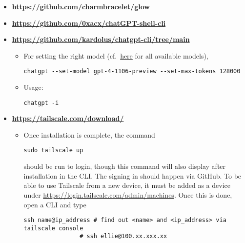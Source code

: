 \documentclass[12pt, a4paper]{article}
\numberwithin{equation}{section}
\theoremstyle{definition}
\theoremstyle{definition}
\begin{document}
	\begin{itemize}
		\item \textbf{\url{https://github.com/charmbracelet/glow}}
		
		\item \textbf{\url{https://github.com/0xacx/chatGPT-shell-cli}}
		
		\item \textbf{\url{https://github.com/kardolus/chatgpt-cli/tree/main}}	
		
		\begin{itemize}
			\item For setting the right model (cf.~\href{https://platform.openai.com/docs/models/gpt-4-and-gpt-4-turbo}{here} for all available models), 
			
			\begin{lstlisting}[style=mystylebash, label=alg:chatgpt_set_model, xleftmargin=\parindent]
				chatgpt --set-model gpt-4-1106-preview --set-max-tokens 128000
			\end{lstlisting}

			\item Usage:

			\begin{lstlisting}[style=mystylebash, label=alg:chatgpt_usage, xleftmargin=\parindent]
				chatgpt -i
			\end{lstlisting}
		\end{itemize}

		\item \textbf{\url{https://tailscale.com/download/}}
		
		\begin{itemize}
			\item Once installation is complete, the command 
			
			\begin{lstlisting}[style=mystylepython, label=alg:tailscale_login, xleftmargin=\parindent]
				sudo tailscale up
			\end{lstlisting}
		
			should be run to login, though this command will also display after installation in the CLI. The signing in should happen via GitHub. To be able to use Tailscale from a new device, it must be added as a device under \url{https://login.tailscale.com/admin/machines}. Once this is done, open a CLI and type 
			
			\begin{lstlisting}[style=mystylepython, label=alg:tailscale_connec, xleftmargin=\parindent]
				ssh name@ip_address # find out <name> and <ip_address> via tailscale console
				# ssh ellie@100.xx.xxx.xx
			\end{lstlisting}
		

\end{itemize}
\end{itemize}
\end{document}
